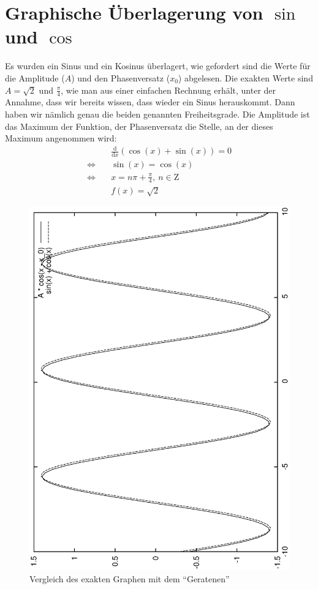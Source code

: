 \section{Graphische Überlagerung von $\sin$ und $\cos$}
Es wurden ein Sinus und ein Kosinus überlagert, wie gefordert sind die Werte für
die Amplitude ($A$) und den Phasenversatz ($x_0$) abgelesen. Die exakten Werte
sind $A = \sqrt 2$ und $\frac{\pi}{4}$, wie man aus einer einfachen Rechnung
erhält, unter der Annahme, dass wir bereits wissen, dass wieder ein Sinus
herauskommt. Dann haben wir nämlich genau die beiden genannten Freiheitsgrade.
Die Amplitude ist das Maximum der Funktion, der Phasenversatz die Stelle, an der
dieses Maximum angenommen wird:
\begin{align*}
    &\frac{\mathrm d}{\mathrm dx}(\cos(x) + \sin(x)) = 0 \\
    \Leftrightarrow \quad & \sin(x) = \cos(x) \\
    \Leftrightarrow \quad & x = n\pi + \frac{\pi}{4},\ n\in\mathrm Z \\
                          & f(x) = \sqrt 2
\end{align*}



\begin{figure}[h!]
  \begin{center}
    \includegraphics{grafiken/vergleich}
  \end{center}
  \caption{Vergleich des exakten Graphen mit dem "`Geratenen"'}
  \label{fig:vergleich}
\end{figure}

